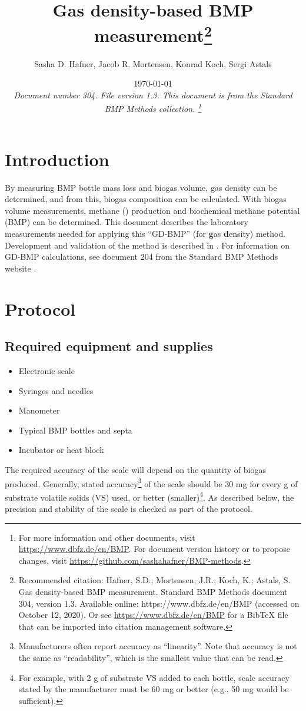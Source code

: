 \documentclass[]{article}
\title {Gas density-based BMP measurement\footnote{
  Recommended citation: 
Hafner, S.D.; Mortensen, J.R.; Koch, K.; Astals, S. Gas density-based BMP measurement. Standard BMP Methods document 304, version 1.3. Available online: https://www.dbfz.de/en/BMP (accessed on October 12, 2020).
\newline
  Or see \url{https://www.dbfz.de/en/BMP} for a BibTeX file that can be imported into citation management software.
}
}
\author{Sasha D. Hafner, Jacob R. Mortensen, Konrad Koch, Sergi Astals}
\date{\today \\
\bigskip
\textit{
  Document number 304.
  File version 1.3. 
  This document is from the Standard BMP Methods collection.
    \footnote{For more information and other documents, visit \url{https://www.dbfz.de/en/BMP}. 
    For document version history or to propose changes, visit \url{https://github.com/sashahafner/BMP-methods}.}
}
}
\begin{document}
\maketitle

\section{Introduction}
By measuring BMP bottle mass loss and biogas volume, gas density can be determined, and from this, biogas composition can be calculated.
With biogas volume measurements, methane () production and biochemical methane potential (BMP) can be determined.
This document describes the laboratory measurements needed for applying this ``GD-BMP'' (for \textbf{g}as \textbf{d}ensity) method.
Development and validation of the method is described in \citet{justesenDevelopmentValidationLowcost2019}.
For information on GD-BMP calculations, see document 204 from the Standard BMP Methods website \citep{BMPdoc204gasdens}. 

\section{Protocol}

\subsection{Required equipment and supplies}

\begin{itemize}
    \item Electronic scale
    \item Syringes and needles
    \item Manometer
    \item Typical BMP bottles and septa
    \item Incubator or heat block
\end{itemize}

The required accuracy of the scale will depend on the quantity of biogas produced. 
Generally, stated accuracy\footnote{
  Manufacturers often report accuracy as ``linearity''. 
  Note that accuracy is not the same as ``readability'', which is the smallest value that can be read. 
} of the scale should be 30 mg for every g of substrate volatile solids (VS) used, or better (smaller)\footnote{
  For example, with 2 g of substrate VS added to each bottle, scale accuracy stated by the manufacturer must be 60 mg or better (e.g., 50 mg would be sufficient).
}.
As described below, the precision and stability of the scale is checked as part of the protocol.
\end{document}
